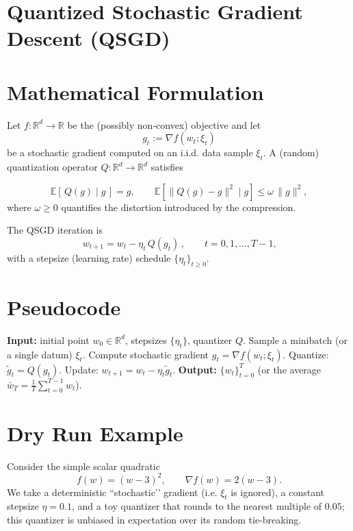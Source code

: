\documentclass{article}
\begin{document}
\section*{Quantized Stochastic Gradient Descent (QSGD)}

\section*{Mathematical Formulation}
Let $f:\mathbb{R}^{d}\rightarrow\mathbb{R}$ be the (possibly non‑convex) objective and let
\[
g_{t}:=\nabla f(w_{t};\xi_{t})
\]
be a stochastic gradient computed on an i.i.d. data sample $\xi_{t}$.  
A (random) quantization operator $Q:\mathbb{R}^{d}\rightarrow\mathbb{R}^{d}$ satisfies  

\[
\mathbb{E}\!\left[\,Q(g)\mid g\,\right]=g ,\qquad 
\mathbb{E}\!\left[\|Q(g)-g\|^{2}\mid g\right]\leq \omega \,\|g\|^{2},
\tag{1}
\]
where $\omega\ge 0$ quantifies the distortion introduced by the compression.

The QSGD iteration is
\[
\boxed{\,w_{t+1}=w_{t}-\eta_{t}\,Q(g_{t})\,},\qquad t=0,1,\dots ,T-1,
\tag{2}
\]
with a stepsize (learning rate) schedule $\{\eta_{t}\}_{t\ge0}$.

\section*{Pseudocode}
\begin{algorithm}[H]
\caption{Quantized Stochastic Gradient Descent (QSGD)}
\begin{algorithmic}[1]
\STATE \textbf{Input:} initial point $w_{0}\in\mathbb{R}^{d}$, stepsizes $\{\eta_{t}\}$, quantizer $Q$.
    \STATE Sample a minibatch (or a single datum) $\xi_{t}$.
    \STATE Compute stochastic gradient $g_{t}= \nabla f(w_{t};\xi_{t})$.
    \STATE Quantize: $\tilde g_{t}=Q(g_{t})$.
    \STATE Update: $w_{t+1}= w_{t}-\eta_{t}\tilde g_{t}$.
\ENDFOR
\STATE \textbf{Output:} $\{w_{t}\}_{t=0}^{T}$ (or the average $\bar w_{T}= \frac{1}{T}\sum_{t=0}^{T-1} w_{t}$).
\end{algorithmic}
\end{algorithm}

\section*{Dry Run Example}
Consider the simple scalar quadratic 
\[
f(w)=(w-3)^{2},\qquad \nabla f(w)=2(w-3).
\]
We take a deterministic “stochastic’’ gradient (i.e. $\xi_{t}$ is ignored), a constant stepsize $\eta=0.1$, and a toy quantizer that rounds to the nearest multiple of $0.05$; this quantizer is unbiased in expectation over its random tie‑breaking.
\end{document}
